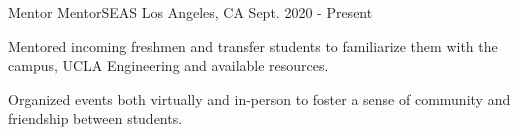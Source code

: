 \begin{cventries}
  \cventry
    {Mentor} %
    {MentorSEAS} %
    {Los Angeles, CA} %
    {Sept. 2020 - Present} %
    {
      \begin{cvitems} %
        \item{Mentored incoming freshmen and transfer students to familiarize them with the campus, UCLA Engineering and available resources.}
        \item{Organized events both virtually and in-person to foster a sense of community and friendship between students.}
      \end{cvitems}
    }
\end{cventries}
